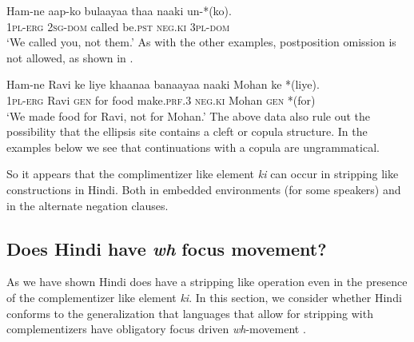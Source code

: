 \documentclass[output=paper]{langscibook}
\begin{document}
\ea \label{maex16}
    \gll Ham-ne aap-ko bulaayaa thaa naaki un-*(ko).\\
    \textsc{1pl-erg} \textsc{2sg-dom} called be.\textsc{pst} \textsc{neg.ki} \textsc{3pl-dom}\\
    \glt `We called you, not them.'
\z 
As with the other examples, postposition omission is not allowed, as shown in .

\ea \label{maex17}
    \gll Ham-ne Ravi ke liye khaanaa banaayaa naaki Mohan ke *(liye).\\
    \textsc{1pl-erg} Ravi \textsc{gen} for food make.\textsc{prf.3} \textsc{neg.ki} Mohan \textsc{gen} *(for)\\
    \glt `We made food for Ravi, not for Mohan.'
\z 
The above data also rule out the possibility that the ellipsis site contains a cleft or copula structure. In the examples below we see that continuations with a copula are ungrammatical.

\ea 
    \z 
\z 
So it appears that the complimentizer like element \emph{ki} can occur in stripping like constructions in Hindi. Both in embedded environments (for some speakers) and in the alternate negation clauses.

\subsection{Does Hindi have \emph{wh} focus movement?}
As we have shown Hindi does have a stripping like operation even in the presence of the complementizer like element \emph{ki}. In this section, we consider whether Hindi conforms to the generalization that languages that allow for stripping with complementizers have obligatory focus driven \textit{wh}-movement \citep{craenenbroeck13}. 
\end{document}
